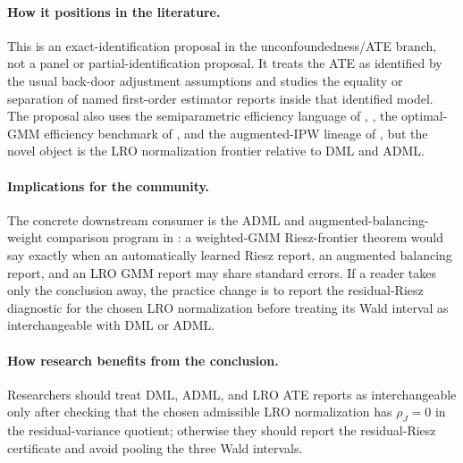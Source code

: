 \documentclass[11pt]{article}
\theoremstyle{definition}
\theoremstyle{plain}
\theoremstyle{remark}
\begin{document}
\paragraph{How it positions in the literature.}
This is an exact-identification proposal in the unconfoundedness/ATE branch, not a panel or partial-identification proposal.  It treats the ATE as identified by the usual back-door adjustment assumptions and studies the equality or separation of named first-order estimator reports inside that identified model.  The proposal also uses the semiparametric efficiency language of \citet{Newey1994Econometrica}, \citet{IchimuraNewey2022QE}, the optimal-GMM efficiency benchmark of \citet{Hansen1982Econometrica}, and the augmented-IPW lineage of \citet{RobinsRotnitzkyZhao1994JASA}, but the novel object is the LRO normalization frontier relative to DML and ADML.

\paragraph{Implications for the community.}
The concrete downstream consumer is the ADML and augmented-balancing-weight comparison program in \citet{BrunsSmithDukesFellerOgburn2025JRSSB}: a weighted-GMM Riesz-frontier theorem would say exactly when an automatically learned Riesz report, an augmented balancing report, and an LRO GMM report may share standard errors.  If a reader takes only the conclusion away, the practice change is to report the residual-Riesz diagnostic for the chosen LRO normalization before treating its Wald interval as interchangeable with DML or ADML.

\paragraph{How research benefits from the conclusion.}
Researchers should treat DML, ADML, and LRO ATE reports as interchangeable only after checking that the chosen admissible LRO normalization has $\rho_J=0$ in the residual-variance quotient; otherwise they should report the residual-Riesz certificate and avoid pooling the three Wald intervals.
\end{document}
